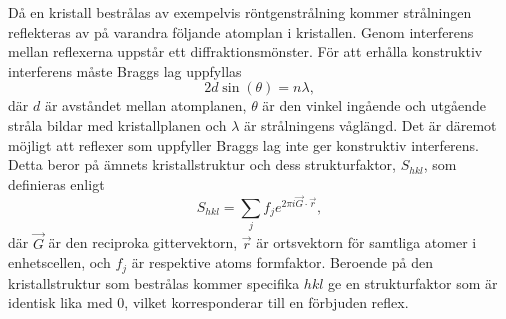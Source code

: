 \documentclass[12pt, a4paper]{article}
\begin{document}
Då en kristall bestrålas av exempelvis röntgenstrålning kommer strålningen reflekteras av på varandra följande atomplan i kristallen. Genom interferens mellan reflexerna uppstår ett diffraktionsmönster. För att erhålla konstruktiv interferens måste Braggs lag uppfyllas
\begin{equation}
    2d\sin(\theta) = n\lambda,
    \label{Eq: Braggs lag}
\end{equation}
där $d$ är avståndet mellan atomplanen, $\theta$ är den vinkel ingående och utgående stråla bildar med kristallplanen och $\lambda$ är strålningens våglängd. Det är däremot möjligt att reflexer som uppfyller Braggs lag inte ger konstruktiv interferens. Detta beror på ämnets kristallstruktur och dess strukturfaktor, $S_{hkl}$, som definieras enligt
\begin{equation}
    S_{hkl} = \sum_j f_j e^{2\pi i \vec G \cdot \vec r},
\end{equation}
där $\vec G$ är den reciproka gittervektorn, $\vec r$ är ortsvektorn för samtliga atomer i enhetscellen, och $f_j$ är respektive atoms formfaktor. Beroende på den kristallstruktur som bestrålas kommer specifika $hkl$ ge en strukturfaktor som är identisk lika med 0, vilket korresponderar till en förbjuden reflex. 
\end{document}
